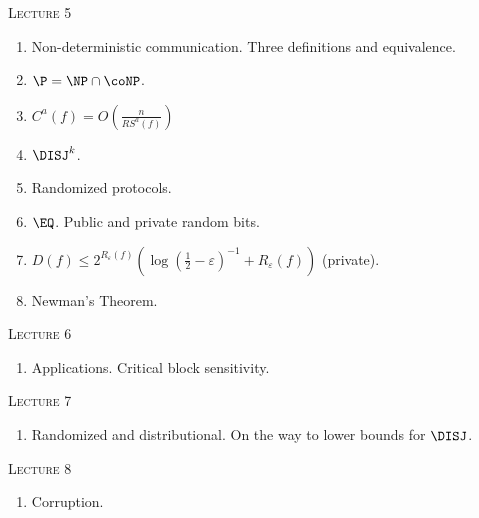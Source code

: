 \centerline{\textsc{Lecture 5}}

\begin{enumerate}
    \item Non-deterministic communication. Three definitions and equivalence.
    \item $\P = \NP \cap \coNP$.
    \item $C^a(f) = O\left(\frac{n}{RS^a(f)}\right)$
    \item $\DISJ^k$.
    \item Randomized protocols.
    \item $\EQ$. Public and private random bits.
    \item $D(f) \le 2^{R_{\varepsilon}(f)} \left( \log(\frac{1}{2} - \varepsilon)^{-1} +
        R_{\varepsilon}(f) \right)$ (private).
    \item Newman's Theorem. 
\end{enumerate}


\centerline{\textsc{Lecture 6}}

\begin{enumerate}
    \item Applications. Critical block sensitivity.
\end{enumerate}

\centerline{\textsc{Lecture 7}}

\begin{enumerate}
    \item Randomized and distributional. On the way to lower bounds for $\DISJ$.
\end{enumerate}

\centerline{\textsc{Lecture 8}}

\begin{enumerate}
    \item Corruption.
\end{enumerate}